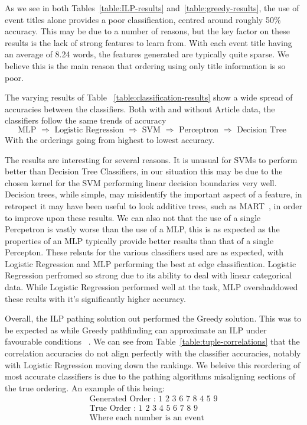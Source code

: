 \documentclass[bsc,frontabs,twoside,singlespacing,parskip,deptreport]{infthesis}     %
\begin{document}
As we see in both Tables~\ref{table:ILP-results} and~\ref{table:greedy-results}, the use of event titles alone
provides a poor classification, centred around roughly 50\% accuracy. This may be due to a number of reasons,
but the key factor on these results is the lack of strong features to learn from. With each event title having an average of
8.24 words, the features generated are typically quite sparse. We believe this is the main reason that ordering using
only title information is so poor.

The varying results of Table ~\ref{table:classification-results} show a wide spread of accuracies between the classifiers.
Both with and without Article data, the classifiers follow the same trends of accuracy
\begin{equation}
\text{MLP $\Rightarrow$ Logistic Regression $\Rightarrow$ SVM $\Rightarrow$ Perceptron $\Rightarrow$ Decision Tree }\nonumber  
\end{equation}
With the orderings going from highest to lowest accuracy.

The results are interesting for several reasons.
It is unusual for SVMs to perform better than Decision Tree Classifiers, in our situation this may be due to the chosen
kernel for the SVM performing linear decision boundaries very well. Decision trees, while simple, may misidentify the important
aspect of a  feature, in retropect it may have been useful to look additive trees, such as MART~\cite{}, in order to
improve upon these results.
We can also not that the use of a single Percpetron is vastly worse than the use of a MLP, this is as expected as
the properties of an MLP typically provide better results than that of a single Percepton.
These relsuts for the various classifiers used are as expected, with Logistic Regression and MLP performing the best
at edge classification. Logistic Regression perfromed so strong due to its ability to deal with linear categorical data.
While Logistic Regression performed well at the task, MLP overshaddowed these reults with it's significantly higher
accuracy. 


Overall, the ILP pathing solution out performed the Greedy solution. This was to be expected as while Greedy pathfinding can
approximate an ILP under favourable conditions ~\cite{}. We can see from Table~\ref{table:tuple-correlations} that the
correlation accuracies do not align perfectly with the classifier accuracies, notably with Logistic Regression moving
down the rankings. We beleive this reordering of most accurate classifiers is due to the pathing algorithms misaligning
sections of the true ordering. An example of this being:
\begin{align}\nonumber
  \text{Generated Order : 1 2 3 6 7 8 4 5 9}\\\nonumber
  \text{True Order : 1 2 3 4 5 6 7 8 9}\\\nonumber
  \text{Where each number is an event}\nonumber
\end{align}
\end{document}
